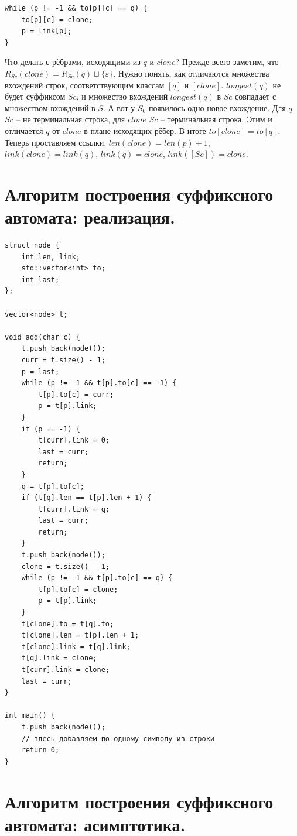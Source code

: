 \begin{lstlisting}
while (p != -1 && to[p][c] == q) {
    to[p][c] = clone;
    p = link[p];
}
\end{lstlisting}
    
    Что делать с рёбрами, исходящими из $q$ и $clone$? Прежде всего заметим, что $R_{Sc} (clone) = R_{Sc} (q) \sqcup \{ \varepsilon \}$. Нужно понять, как отличаются множества вхождений строк, соответствующим классам $[q]$ и $[clone]$. $longest(q)$ не будет суффиксом $Sc$, и множество вхождений $longest(q)$ в $Sc$ совпадает с множеством вхождений в $S$. А вот у $S_0$ появилось одно новое вхождение. Для $q$ $Sc$ -- не терминальная строка, для $clone$ $Sc$ -- терминальная строка. Этим и отличается $q$ от $clone$ в плане исходящих рёбер. В итоге $to[clone] = to[q]$. Теперь проставляем ссылки. $len(clone) = len(p) + 1$, $link(clone) = link(q)$, $link(q) = clone$, $link([Sc]) = clone$.
    
\newpage{}

\section{Алгоритм построения суффиксного автомата: реализация.}

\begin{lstlisting}
struct node {
    int len, link;
    std::vector<int> to;
    int last;
};

vector<node> t;

void add(char c) {
    t.push_back(node());
    curr = t.size() - 1;
    p = last;
    while (p != -1 && t[p].to[c] == -1) {
        t[p].to[c] = curr;
        p = t[p].link;
    }
    if (p == -1) {
        t[curr].link = 0;
        last = curr;
        return;
    }
    q = t[p].to[c];
    if (t[q].len == t[p].len + 1) {
        t[curr].link = q;
        last = curr;
        return;
    }
    t.push_back(node());
    clone = t.size() - 1;
    while (p != -1 && t[p].to[c] == q) {
        t[p].to[c] = clone;
        p = t[p].link;
    }
    t[clone].to = t[q].to;
    t[clone].len = t[p].len + 1;
    t[clone].link = t[q].link;
    t[q].link = clone;
    t[curr].link = clone;
    last = curr;
}

int main() {
    t.push_back(node());
    // здесь добавляем по одному символу из строки
    return 0;
}
\end{lstlisting}

\newpage{}

\section{Алгоритм построения суффиксного автомата: асимптотика.}

